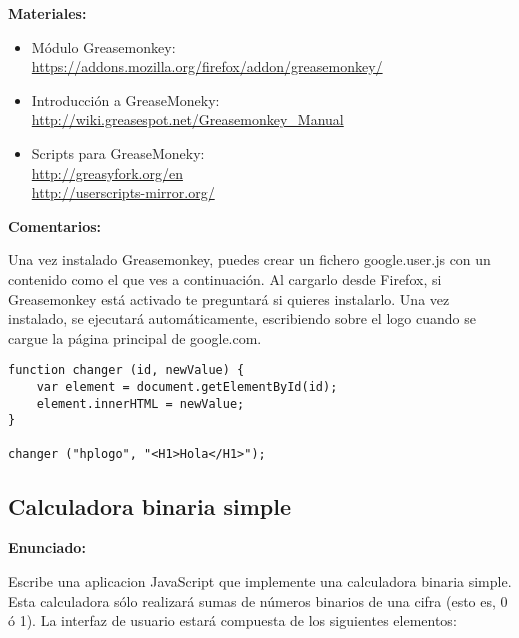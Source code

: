 \textbf{Materiales:}

\begin{itemize}
\item Módulo Greasemonkey: \\
  \url{https://addons.mozilla.org/firefox/addon/greasemonkey/}

\item Introducción a GreaseMoneky: \\
  \url{http://wiki.greasespot.net/Greasemonkey_Manual}

\item Scripts para GreaseMoneky: \\
  \url{http://greasyfork.org/en} \\
  \url{http://userscripts-mirror.org/} \\

\end{itemize}

\textbf{Comentarios:}

Una vez instalado Greasemonkey, puedes crear un fichero google.user.js con un contenido como el que ves a continuación. Al cargarlo desde Firefox, si Greasemonkey está activado te preguntará si quieres instalarlo. Una vez instalado, se ejecutará automáticamente, escribiendo sobre el logo cuando se cargue la página principal de google.com.

\begin{verbatim}
function changer (id, newValue) {
    var element = document.getElementById(id);
    element.innerHTML = newValue;
}

changer ("hplogo", "<H1>Hola</H1>");
\end{verbatim}

\subsection{Calculadora binaria simple}
\label{subsec:eje-js-calc-binaria-1}


\textbf{Enunciado:}

Escribe una aplicacion JavaScript que implemente una calculadora binaria simple. Esta calculadora sólo realizará sumas de números binarios de una cifra (esto es, 0 ó 1). La interfaz de usuario estará compuesta de los siguientes elementos:

